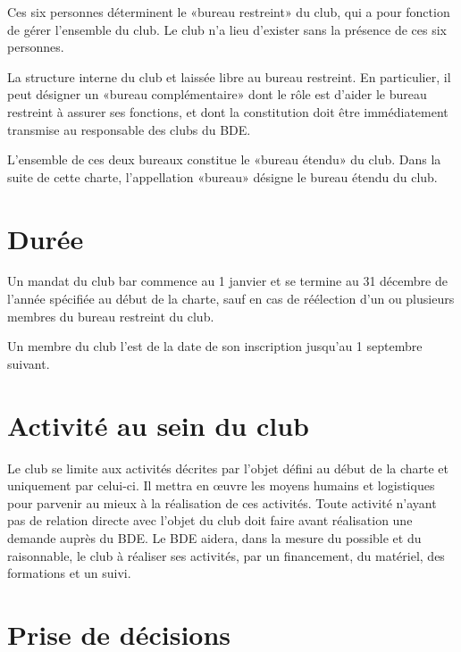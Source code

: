 \documentclass{article} %
\begin{document}
\begin{multicols}{2}
{			Ces six personnes déterminent le «bureau restreint» du club, qui a
			pour fonction de gérer l'ensemble du club. Le club n'a lieu
			d'exister sans la présence de ces six personnes.

			La structure interne du club et laissée libre au bureau restreint.
			En particulier, il peut désigner un «bureau complémentaire» dont le
			rôle est d'aider le bureau restreint à assurer ses fonctions, et
			dont la constitution doit être immédiatement transmise au
			responsable des clubs du BDE\@.

			L'ensemble de ces deux bureaux constitue le «bureau étendu» du club.
			Dans la suite de cette charte, l'appellation «bureau» désigne le
			bureau étendu du club.

		}

		\section{Durée}
\label{sec:duree}

		{\small
		
			Un mandat du club bar commence au 1 janvier et se termine au
			31 décembre de l'année spécifiée au début de la charte, sauf en cas
			de réélection d'un ou plusieurs membres du bureau restreint du club.

			Un membre du club l'est de la date de son inscription jusqu'au
			1 septembre suivant.

		}

		\section{Activité au sein du club}
\label{sec:activite}
		
		{\small
		
			Le club se limite aux activités décrites par l’objet défini au début
			de la charte et uniquement par celui-ci. Il mettra en œuvre les
			moyens humains et logistiques pour parvenir au mieux à la
			réalisation de ces activités. Toute activité n’ayant pas de relation
			directe avec l’objet du club doit faire avant réalisation une
			demande auprès du BDE\@. Le BDE aidera, dans la mesure du possible
			et du raisonnable, le club à réaliser ses activités, par un
			financement, du matériel, des formations et un suivi.

		}

		\section{Prise de décisions}
\label{sec:decisions}


\end{multicols}
\end{document}
